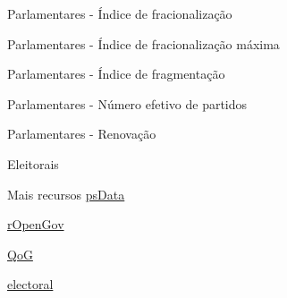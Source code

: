 \documentclass[
  9pt,
  ignorenonframetext,
  aspectratio=169]{beamer}
\begin{document}
\begin{frame}{Parlamentares - Índice de fracionalização}
\protect\hypertarget{parlamentares---uxedndice-de-fracionalizauxe7uxe3o}{}
\end{frame}

\begin{frame}{Parlamentares - Índice de fracionalização máxima}
\protect\hypertarget{parlamentares---uxedndice-de-fracionalizauxe7uxe3o-muxe1xima}{}
\end{frame}

\begin{frame}{Parlamentares - Índice de fragmentação}
\protect\hypertarget{parlamentares---uxedndice-de-fragmentauxe7uxe3o}{}
\end{frame}

\begin{frame}{Parlamentares - Número efetivo de partidos}
\protect\hypertarget{parlamentares---nuxfamero-efetivo-de-partidos}{}
\end{frame}

\begin{frame}{Parlamentares - Renovação}
\protect\hypertarget{parlamentares---renovauxe7uxe3o}{}
\end{frame}

\begin{frame}{Eleitorais}
\protect\hypertarget{eleitorais}{}
\end{frame}

\begin{frame}{Mais recursos}
\protect\hypertarget{mais-recursos}{}
\href{https://github.com/rOpenGov/psData}{psData}

\href{http://ropengov.github.io/projects/}{rOpenGov}

\href{http://ropengov.github.io/rqog/}{QoG}

\href{https://cran.r-project.org/web/packages/electoral/index.html}{electoral}
\end{frame}
\end{document}

